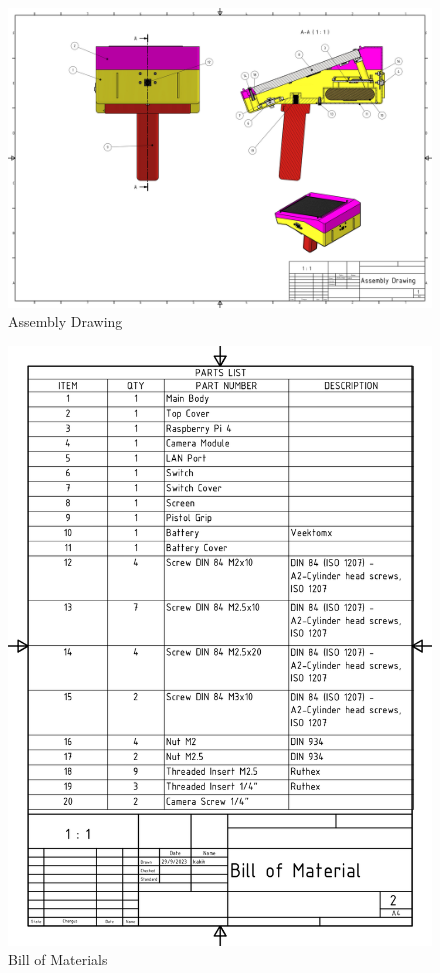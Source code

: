 \begin{figure}[H]
    \centering
    \includegraphics[width=1.2\linewidth, angle = 90]{texs/appendix/data/technicaldrawing/assembly.jpg}
    \caption{Assembly Drawing}
    \label{fig:cad-drawing-assembly}
\end{figure}

\begin{figure}[H]
    \centering
    \includegraphics[width=0.9\linewidth]{texs/appendix/data/technicaldrawing/bom.jpg}
    \caption{Bill of Materials}
    \label{fig:cad-drawing-bom}
\end{figure}

